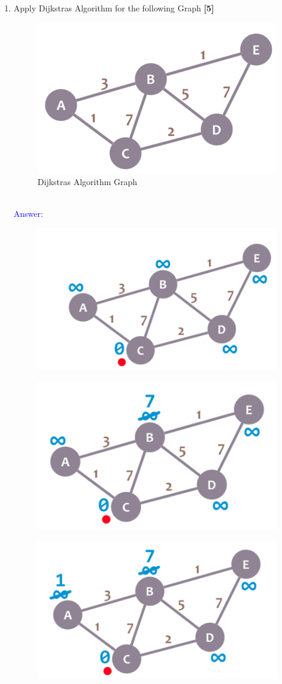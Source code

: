 \documentclass[12pt ,a4paper]{exam}
\begin{document}
\begin{enumerate}[start=1,label={\bfseries Q\arabic*)}]
	\item Apply Dijkstras Algorithm for the following Graph \hfill\textbf{[5]} 
	\begin{figure}[h]
		\centering
		\includegraphics[width=0.3\linewidth]{"Screenshot 2020-12-27 at 10.00.41 PM"}
		\caption{Dijkstras Algorithm Graph}
		\label{fig:screenshot-2020-12-27-at-10}
	\end{figure}\\
    	\textcolor{blue}{Answer: }
    	\begin{figure}[h!]
    		\centering
    		\includegraphics[width=0.3\linewidth]{"Screenshot 2020-12-27 at 10.03.49 PM"}
    		\caption{}
    		\label{fig:screenshot-2020-12-27-at-10}
    	\end{figure}
    	\begin{figure}[h!]
    		\centering
    		\includegraphics[width=0.3\linewidth]{"Screenshot 2020-12-27 at 10.03.56 PM"}
    		\caption{}
    		\label{fig:screenshot-2020-12-27-at-10}
    	\end{figure}
    	\begin{figure}[h!]
    		\centering
    		\includegraphics[width=0.3\linewidth]{"Screenshot 2020-12-27 at 10.04.02 PM"}
    		\caption{}
    		\label{fig:screenshot-2020-12-27-at-10}
    	\end{figure}


\end{enumerate}
\end{document}
